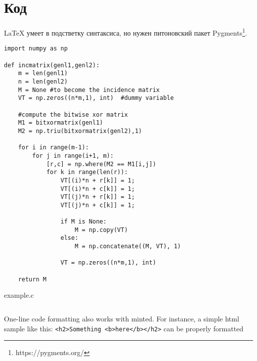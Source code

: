 \section{Код}

\LaTeX{} умеет в подстветку синтаксиса,
но нужен питоновский пакет Pygments\footnote{https://pygments.org/}.

\begin{verbatim}
import numpy as np
    
def incmatrix(genl1,genl2):
    m = len(genl1)
    n = len(genl2)
    M = None #to become the incidence matrix
    VT = np.zeros((n*m,1), int)  #dummy variable
    
    #compute the bitwise xor matrix
    M1 = bitxormatrix(genl1)
    M2 = np.triu(bitxormatrix(genl2),1) 

    for i in range(m-1):
        for j in range(i+1, m):
            [r,c] = np.where(M2 == M1[i,j])
            for k in range(len(r)):
                VT[(i)*n + r[k]] = 1;
                VT[(i)*n + c[k]] = 1;
                VT[(j)*n + r[k]] = 1;
                VT[(j)*n + c[k]] = 1;
                
                if M is None:
                    M = np.copy(VT)
                else:
                    M = np.concatenate((M, VT), 1)
                
                VT = np.zeros((n*m,1), int)
    
    return M
\end{verbatim}

\begin{listing}[H]
\caption{example.c}\label{lst:example}
\inputminted{c}{inc/example.c}
\end{listing}

One-line code formatting also works with minted. For instance, a simple html 
sample like this:
\texttt{<h2>Something <b>here</b></h2>}
can be properly 
formatted
